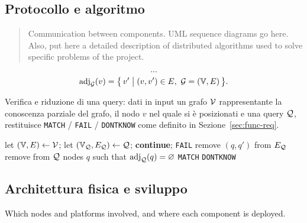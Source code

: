 \subsection{Protocollo e algoritmo}
\label{sec:protocols}
\begin{quote}
Communication between components.
UML sequence diagrams go here.
Also, put here a detailed description of distributed algorithms
used to solve specific problems of the project.
\end{quote}

\[...\]
\[
\mathrm{adj}_{\mathcal{G}}(v) = \bigl\{\, v' \bigm| (v, v') \in E,
\ \mathcal{G} = (\mathbb{V}, E) \,\bigr\}.
\]
\begin{algorithm}
  \caption{Verifica e riduzione di una query: dati in input
    un grafo $\mathcal{V}$ rappresentante la conoscenza parziale del grafo,
    il nodo $v$ nel quale si è posizionati e
    una query $\mathcal{Q}$, restituisce \texttt{MATCH} / \texttt{FAIL}
    / \texttt{DONTKNOW} come definito in Sezione~\ref{sec:func-req}.
  }
\label{alg:check-and-reduce}
\begin{algorithmic}[2]
  \State let $(\mathbb{V}, E) \gets \mathcal{V}$;
  \State let $(\mathbb{V}_{\mathcal{Q}}, E_{\mathcal{Q}}) \gets \mathcal{Q}$;
     \textbf{continue}; \EndIf
       \State \Return \texttt{FAIL}
    \EndIf
      \State remove $(q, q')$ from $E_{\mathcal{Q}}$
      \EndIf
    \EndFor
  \EndFor
  \State remove from $\mathcal{Q}$ nodes $q$ such that
  $\mathrm{adj}_{\mathcal{Q}}(q) = \varnothing$
  \If {$\Vset_\cQ = \varnothing$}
    \State \Return \texttt{MATCH}
  \Else
    \State \Return \texttt{DONTKNOW}
  \EndIf
\EndFunction
\end{algorithmic}
\end{algorithm}

\subsection{Architettura fisica e sviluppo}
\label{sec:deploy}
Which nodes and platforms involved, and where each
component is deployed.


